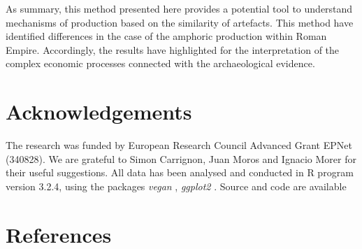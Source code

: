\documentclass[review]{elsarticle}
\begin{document}
As summary, this method presented here provides a potential tool to understand mechanisms of production based on the similarity of artefacts. This method have identified differences in the case of the amphoric production within Roman Empire. Accordingly, the results have highlighted for the interpretation of the complex economic processes connected with the archaeological evidence. 



\section{Acknowledgements}
The research was funded by European Research Council Advanced Grant EPNet (340828). We are grateful to Simon Carrignon, Juan Moros and Ignacio Morer for their useful suggestions.  
All data has been analysed and conducted in R program version 3.2.4, using the packages \textit{vegan} \citep{oksanen_vegan_2007}, \textit{ggplot2} \citep{ggplot2:_2016}. Source and code are available 


\section{References}


\end{document}
